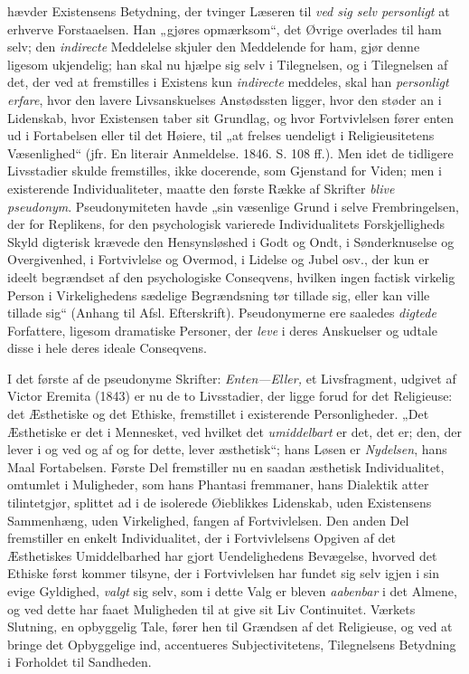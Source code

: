 \documentclass[12pt,a4paper]{book}
\begin{document}
hævder Existensens Betydning, der tvinger Læseren til \emph{ved sig selv
personligt} at erhverve Forstaaelsen. Han „gjøres opmærksom“, det Øvrige
overlades til ham selv; den \emph{indirecte} Meddelelse skjuler den
Meddelende for ham, gjør denne ligesom ukjendelig; han skal nu hjælpe sig
selv i Tilegnelsen, og i Tilegnelsen af det, der ved at fremstilles i
Existens kun \emph{indirecte} meddeles, skal han \emph{personligt erfare},
hvor den lavere Livsanskuelses Anstødssten ligger, hvor den støder an i
Lidenskab, hvor Existensen taber sit Grundlag, og hvor Fortvivlelsen fører
enten ud i Fortabelsen eller til det Høiere, til „at frelses uendeligt i
Religieusitetens Væsenlighed“ (jfr. En literair Anmeldelse. 1846. S. 108
ff.). Men idet de tidligere Livsstadier skulde fremstilles, ikke docerende,
som Gjenstand for Viden; men i existerende Individualiteter, maatte den
første Række af Skrifter \emph{blive pseudonym}. Pseudonymiteten havde „sin
væsenlige Grund i selve Frembringelsen, der for Replikens, for den
psychologisk varierede Individualitets Forskjelligheds Skyld digterisk
krævede den Hensynsløshed i Godt og Ondt, i Sønderknuselse og Overgivenhed,
i Fortvivlelse og Overmod, i Lidelse og Jubel osv., der kun er ideelt
begrændset af den psychologiske Conseqvens, hvilken ingen factisk virkelig
Person i Virkelighedens sædelige Begrændsning tør tillade sig, eller kan
ville tillade sig“ (Anhang til Afsl. Efterskrift). Pseudonymerne ere
saaledes \emph{digtede} Forfattere, ligesom dramatiske Personer, der
\emph{leve} i deres Anskuelser og udtale disse i hele deres ideale
Conseqvens.

I det første af de pseudonyme Skrifter: \emph{Enten---Eller,} et
Livsfragment, udgivet af Victor Eremita (1843) er nu de to Livsstadier, der
ligge forud for det Religieuse: det Æsthetiske og det Ethiske, fremstillet i
existerende Personligheder. „Det Æsthetiske er det i Mennesket, ved hvilket
det \emph{umiddelbart} er det, det er; den, der lever i og ved og af og for
dette, lever æsthetisk“; hans Løsen er \emph{Nydelsen}, hans Maal
Fortabelsen. Første Del fremstiller nu en saadan æsthetisk Individualitet,
omtumlet i Muligheder, som hans Phantasi fremmaner, hans Dialektik atter
tilintetgjør, splittet ad i de isolerede Øieblikkes Lidenskab, uden
Existensens Sammenhæng, uden Virkelighed, fangen af Fortvivlelsen. Den anden
Del fremstiller en enkelt Individualitet, der i Fortvivlelsens Opgiven af
det Æsthetiskes Umiddelbarhed har gjort Uendelighedens Bevægelse, hvorved
det Ethiske først kommer tilsyne, der i Fortvivlelsen har fundet sig selv
igjen i sin evige Gyldighed, \emph{valgt} sig selv, som i dette Valg er
bleven \emph{aabenbar} i det Almene, og ved dette har faaet Muligheden til
at give sit Liv Continuitet. Værkets Slutning, en opbyggelig Tale, fører hen
til Grændsen af det Religieuse, og ved at bringe det Opbyggelige ind,
accentueres Subjectivitetens, Tilegnelsens Betydning i Forholdet til
Sandheden.
\end{document}
